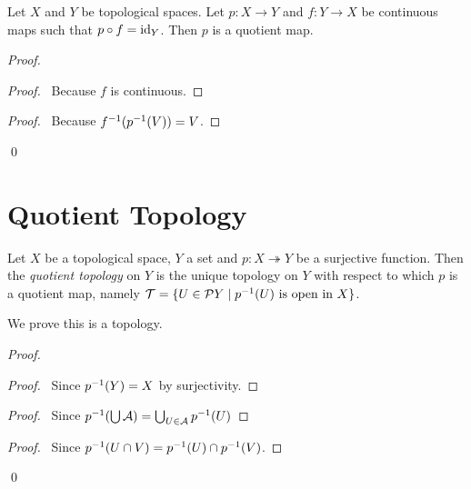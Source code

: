 \begin{proposition}
    \label{proposition:quotient_retraction}
    Let $X$ and $Y$ be topological spaces. Let $p : X \rightarrow Y$ and $f : Y \rightarrow X$ be continuous maps such that $p \circ f = \mathrm{id}_{Y}$. Then $p$ is a quotient map.
\end{proposition}

\begin{proof}
    \pf
    \begin{proof}
        \pf\ Because $f$ is continuous.
    \end{proof}
    \begin{proof}
        \pf\ Because ${f}^{-1}({p}^{-1}(V)) = V$.
    \end{proof}
    \qed
\end{proof}

\section{Quotient Topology}

\begin{definition}
    Let $X$ be a topological space, $Y$ a set and $p : X \twoheadrightarrow Y$ be a surjective function. Then the \emph{quotient topology} on $Y$ is the unique topology
    on $Y$ with respect to which $p$ is a quotient map, namely $\mathcal{T} = \{ U \in \mathcal{P} Y \mid {p}^{-1}(U) \text{ is open in } X \}$.
\end{definition}

We prove this is a topology.

\begin{proof}
    \pf
    \begin{proof}
        \pf\ Since ${p}^{-1}(Y) = X$ by surjectivity.
    \end{proof}
    \begin{proof}
        \pf\ Since ${p}^{-1}(\bigcup \mathcal{A}) = \bigcup_{U \in \mathcal{A}} {p}^{-1}(U)$
    \end{proof}
    \begin{proof}
        \pf\ Since ${p}^{-1}(U \cap V) = {p}^{-1}(U) \cap {p}^{-1}(V)$.
    \end{proof}
    \qed
\end{proof}

